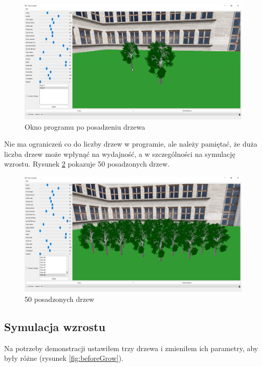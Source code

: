 \documentclass[a4paper,12pt,twoside]{book} %
\begin{document}
\begin{figure}[H]
	\centering\includegraphics[width=15.5cm]{grafika/program/placeTree2.png}
	\caption{Okno programu po posadzeniu drzewa}
    \label{fig:placeTree2}
\end{figure}

Nie ma ograniczeń co do liczby drzew w programie, 
ale należy pamiętać, że duża liczba drzew może wpłynąć na wydajność, 
a w szczególności na symulację wzrostu. Rysunek \ref{fig:50trees} pokazuje 
50 posadzonych drzew.

\begin{figure}[H]
	\centering\includegraphics[width=15.5cm]{grafika/program/50trees.png}
	\caption{50 posadzonych drzew}
    \label{fig:50trees}
\end{figure}

\subsection{Symulacja wzrostu}

Na potrzeby demonstracji ustawiłem trzy drzewa i 
zmieniłem ich parametry, aby były różne (rysunek \ref{fig:beforeGrow}).
\end{document}
